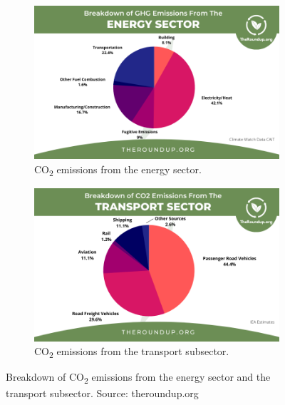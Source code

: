 \begin{figure}[h!]

    \begin{subfigure}{0.5\textwidth}
    \includegraphics[width=1\textwidth]{images/chapter01/energy_emss.png}
    \caption{CO\textsubscript{2} emissions from the energy sector.}
    \label{fig:sub_energy}
    \end{subfigure}
    \begin{subfigure}{0.5\textwidth}
    \includegraphics[width=1\textwidth]{images/chapter01/transport_emss.png}
    \caption{CO\textsubscript{2} emissions from the transport subsector.}
    \label{fig:sub_transport}
    \end{subfigure}
    
    \caption{Breakdown of CO\textsubscript{2} emissions from the energy sector and the transport subsector. Source: theroundup.org}
    \label{emss_2images}
\end{figure}

